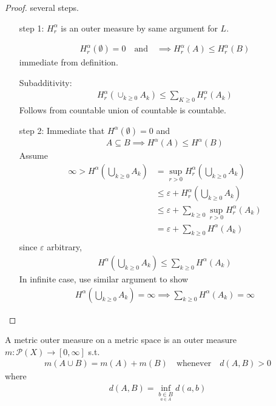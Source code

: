 \begin{proof} several steps.
	\begin{enumerate}
		\item[step 1:] $H_{r}^{\alpha}$ is an outer measure by same argument for $L$.

			\begin{align*}
			H_{r}^{\alpha} (\emptyset)= 0 \quad \text{and} \quad \implies H_{r}^{\alpha} (A) \leq H_{r}^{\alpha} (B)
			\end{align*} 
			immediate from definition.

			Subadditivity:
			\begin{align*}
			H_{r}^{\alpha} ( \cup_{k \geq 0} A_{k}) \leq \sum_{K \geq 0} H_{r}^{\alpha} (A_k)
			\end{align*} Follows from countable union of countable is countable.

		\item[step 2:] Immediate that $H^{\alpha} (\emptyset) = 0$ and 
			\begin{align*}
			A \subseteq B \implies H^{\alpha} (A) \leq H^{\alpha}(B)
			\end{align*} Assume
			\begin{align*}
				\infty > H^{\alpha}( \bigcup_{k \geq 0} A_k ) &= \sup_{r > 0} H_{r}^{\alpha} ( \bigcup_{k \geq 0} A_k) \\
															  &\leq \varepsilon + H_{r}^{\alpha} ( \bigcup_{k \geq 0} A_k) \\ 
															  &\leq \varepsilon +  \sum_{k \geq 0} \sup_{r > 0} H_{r}^{\alpha} ( A_k) \\ 
															  &= \varepsilon +  \sum_{k \geq 0} H^{\alpha} ( A_k) \\ 
			\end{align*} since $\varepsilon$ arbitrary, 
			\begin{align*}
			H^{\alpha} ( \bigcup_{k \geq 0} A_k) \leq \sum_{k \geq 0} H^{\alpha} ( A_k)
			\end{align*}
			In infinite case, use similar argument to show
		\begin{align*}
					H^{\alpha} ( \bigcup_{k \geq 0} A_k) = \infty \implies \sum_{k \geq 0} H^{\alpha} ( A_k) = \infty
		\end{align*} 
	\end{enumerate}
\end{proof}

\begin{definition}
	A metric outer measure on a metric space is an outer measure $m : \mathcal{P}(X) \to [0,\infty]$ s.t. 
	\begin{align*}
	m(A \cup B) = m(A) + m(B) \quad \text{whenever} \quad d(A,B) > 0
	\end{align*} 
	where  
	\begin{align*}
		d(A,B) = \inf_{\underset{a \in A}{b \in B}} d(a,b)
	\end{align*} 
\end{definition}


